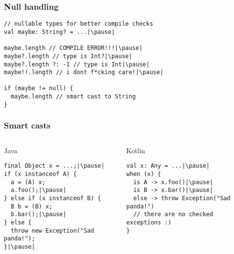 
\begin{withoutheadline}
\end{withoutheadline}

\begin{frame}[fragile] \frametitle{Null handling}
\pause
\begin{lstlisting}
// nullable types for better compile checks
val maybe: String? = ...|\pause|

maybe.length // COMPILE ERROR!!!|\pause|
maybe?.length // type is Int?|\pause|
maybe?.length ?: -1 // type is Int|\pause|
maybe!!.length // i dont f*cking care!|\pause|

if (maybe != null) {
  maybe.length // smart cast to String
}
\end{lstlisting}
\end{frame}



\begin{frame}[fragile]
\frametitle{Smart casts}
\pause
\begin{columns}[t]
\begin{column}{0.5\textwidth}
\begin{center}
  Java
\end{center}
\begin{lstlisting}[style=twosided]
final Object x = ...;|\pause|
if (x instanceof A) {
  a = (A) x;
  a.foo();|\pause|
} else if (x instanceof B) {
  B b = (B) x;
  b.bar();|\pause|
} else {
  throw new Exception("Sad panda!");
}|\pause|
\end{lstlisting}
\end{column}
\begin{column}{0.5\textwidth}
\begin{center}
  Kotlin
\end{center}
\begin{lstlisting}[style=twosided]
val x: Any = ...|\pause|
when (x) {
  is A -> x.foo()|\pause|
  is B -> x.bar()|\pause|
  else -> throw Exception("Sad panda!")
  // there are no checked exceptions :)
}
\end{lstlisting}
\end{column}
\end{columns}
\end{frame}


